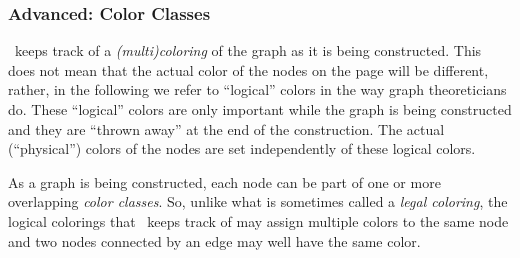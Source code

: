 \subsubsection{Advanced: Color Classes}

\label{section-library-graph-coloring}

\tikzname\ keeps track of a \emph{(multi)coloring} of the graph as it
is being constructed. This does not mean that the 
actual color of the nodes on the page will be different, rather, in
the following we refer to ``logical'' colors in the way graph
theoreticians do. These ``logical'' colors are only important while
the graph is being constructed and they are ``thrown away'' at the end
of the construction. The actual (``physical'') colors of the nodes are
set independently of these logical colors.

As a graph is being constructed, each node can be part of one or more
overlapping \emph{color classes}. So, unlike what is sometimes called a
\emph{legal coloring}, the logical colorings that \tikzname\ keeps
track of may assign multiple colors to the same node and two nodes
connected by an edge may well have the same color.

